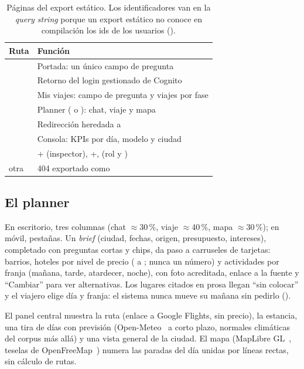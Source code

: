 \begin{table}[tb]\centering\footnotesize
\begin{tabularx}{\columnwidth}{@{}lY@{}}\toprule
Ruta & Función \\\midrule
\code{/} & Portada: un único campo de pregunta \\
 & Retorno del login gestionado de Cognito \\
 & Mis viajes: campo de pregunta y viajes por fase \\
 & Planner ( o ): chat, viaje y mapa \\
 & Redirección heredada a  \\
 & Consola: KPIs por día, modelo y ciudad \\
 & + (inspector), +,  (rol y ) \\
otra & 404 exportado como  \\\bottomrule
\end{tabularx}
\caption{Páginas del export estático. Los identificadores van en la \emph{query string} porque
un export estático no conoce en compilación los ids de los usuarios ().}
\label{tab:02-rutas}
\end{table}

\subsection{El planner}

En escritorio, tres columnas (chat $\approx$30\,\%, viaje $\approx$40\,\%, mapa $\approx$30\,\%);
en móvil, pestañas. Un \emph{brief} (ciudad, fechas, origen, presupuesto, intereses), completado con
preguntas cortas y chips, da paso a carruseles de tarjetas: barrios, hoteles por nivel de precio ( a
; nunca un número) y actividades por franja (mañana, tarde, atardecer, noche), con
foto acreditada, enlace a la fuente y ``Cambiar'' para ver alternativas. Los lugares
citados en prosa llegan ``sin colocar'' y el viajero elige día y franja: el sistema nunca mueve
su mañana sin pedirlo ().

El panel central muestra la ruta (enlace a Google Flights, sin precio), la estancia, una tira
de días con previsión (Open-Meteo~\cite{fe:openmeteo} a corto plazo, normales climáticas del
corpus más allá) y una vista general de la ciudad. El mapa (MapLibre GL~\cite{fe:maplibre}, teselas de
OpenFreeMap~\cite{fe:openfreemap}) numera las paradas del día unidas por líneas rectas, sin
cálculo de rutas.

